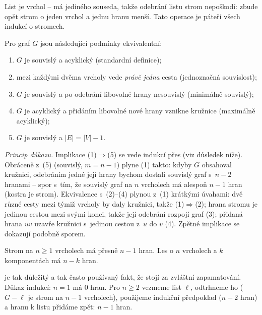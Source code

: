\documentclass[11pt,a4paper]{article}
\begin{document}
\begin{intuice}
List je  vrchol -- má jediného souseda, takže odebrání listu strom nepoškodí: zbude opět strom o jeden vrchol a jednu hranu menší. Tato operace je páteří všech indukcí o stromech.
\end{intuice}

\begin{veta}
Pro graf $G$ jsou následující podmínky ekvivalentní:
\begin{enumerate}[label=(\arabic*)]
  \item $G$ je souvislý a acyklický (standardní definice);
  \item mezi každými dvěma vrcholy vede \emph{právě jedna} cesta (jednoznačná souvislost);
  \item $G$ je souvislý a po odebrání libovolné hrany nesouvislý (minimálně souvislý);
  \item $G$ je acyklický a přidáním libovolné nové hrany vznikne kružnice (maximálně acyklický);
  \item $G$ je souvislý a $|E|=|V|-1$.
\end{enumerate}
\end{veta}

\begin{poznamka}
\emph{Princip důkazu.} Implikace (1)$\Rightarrow$(5) se vede indukcí přes  (viz důsledek níže). Obráceně z~(5) (souvislý, $m=n-1$) plyne (1) takto: kdyby $G$ obsahoval kružnici, odebráním jedné její hrany bychom dostali souvislý graf s~$n-2$ hranami -- spor s~tím, že souvislý graf na $n$ vrcholech má alespoň $n-1$ hran (kostra je strom). Ekvivalence s~(2)--(4) plynou z~(1) krátkými úvahami: dvě různé cesty mezi týmiž vrcholy by daly kružnici, takže (1)$\Rightarrow$(2); hrana stromu je jedinou cestou mezi svými konci, takže její odebrání rozpojí graf (3); přidaná hrana $uv$ uzavře kružnici s~jedinou cestou z~$u$ do $v$ (4). Zpětné implikace se dokazují podobně sporem.
\end{poznamka}

\begin{dusledek}
Strom na $n\ge 1$ vrcholech má přesně $n-1$ hran. Les o $n$ vrcholech a $k$ komponentách má $n-k$ hran.
\end{dusledek}

\begin{intuice}
 je tak důležitý a tak často používaný fakt, že stojí za zvláštní zapamatování. Důkaz indukcí: $n=1$ má 0 hran. Pro $n\ge 2$ vezmeme list $\ell$, odtrhneme ho ($G-\ell$ je strom na $n-1$ vrcholech), použijeme indukční předpoklad ($n-2$ hran) a hranu k listu přidáme zpět: $n-1$ hran.
\end{intuice}
\end{document}

